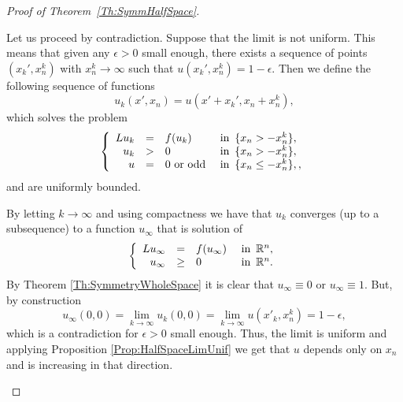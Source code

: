 \begin{proof}[Proof of Theorem~\ref{Th:SymmHalfSpace}]
\begin{enumerate}
Let us proceed by contradiction. Suppose that the limit is not uniform. This means that given any $\epsilon>0$ small enough, there exists a sequence of points $(x_k',x_n^k)$ with $x_n^k\to \infty$ such that $u(x_k',x_n^k) = 1-\epsilon$. Then we define the following sequence of functions
$$ u_k(x',x_n) = u(x'+x_k',x_n+x_n^k), $$
which solves the problem
\begin{equation}
\left\{\begin{array}{rcll}
Lu_k &=& f(u_k)   &\textrm{ in } \,\{x_n>-x_n^k\},\\
u_k &>& 0   &\textrm{ in } \,\{x_n>-x_n^k\},\\
u &=& 0 \,\, \text{or odd}  &\textrm{ in } \,\{x_n\leq-x_n^k\},,
\end{array} \right.
\end{equation}
and are uniformly bounded.

By letting $k\to\infty$ and using compactness \todo{!!!!} we have that $u_k$ converges (up to a subsequence) to a function $u_\infty$ that is solution of
\begin{equation}
\left\{\begin{array}{rcll}
Lu_\infty &=& f(u_\infty)   &\textrm{ in } \,\mathbb{R}^n,\\
u_\infty &\geq& 0   &\textrm{ in } \,\mathbb{R}^n.
\end{array} \right.
\end{equation}
By Theorem \ref{Th:SymmetryWholeSpace} it is clear that $u_\infty\equiv 0$ or $u_\infty \equiv 1$. But, by construction
$$ u_\infty(0,0) = \lim_{k\to \infty} u_k(0,0) = \lim_{k\to \infty} u(x'_k,x_n^k) = 1-\epsilon, $$
which is a contradiction for $\epsilon>0$ small enough. Thus, the limit is uniform and applying Proposition \ref{Prop:HalfSpaceLimUnif} we get that $u$ depends only on $x_n$ and is increasing in that direction.
\end{enumerate}
\end{proof}


